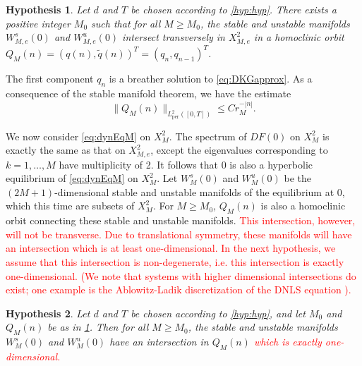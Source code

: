 \documentclass[12pt,reqno]{amsart}
\def\per{\textrm{per}}
\newtheorem{hypothesis}{Hypothesis}
\theoremstyle{definition}
\newcommand{\revised}[1]{ \textcolor{red}{#1} }
\begin{document}
\begin{hypothesis}\label{hyp:breather}
Let $d$ and $T$ be chosen according to \cref{hyp:hyp}. There exists a positive integer $M_0$ such that for all $M \geq M_0$, the stable and unstable manifolds $W_{M,e}^s(0)$ and $W_{M,e}^u(0)$ intersect transversely in $X_{M,e}^2$ in a homoclinic orbit $Q_M(n) = (q(n), \tilde{q}(n))^T = (q_n, q_{n-1})^T$. 
\end{hypothesis}
The first component $q_n$ is a breather solution to \cref{eq:DKGapprox}. As a consequence of the stable manifold theorem, we have the estimate 
\begin{equation}\label{eq:U1decayest}
\|Q_M(n)\|_{L^2_\per([0,T])} \leq C r_M^{-|n|}.
\end{equation}

We now consider \cref{eq:dynEqM} on $X_M^2$. The spectrum of $DF(0)$ on $X_M^2$ is exactly the same as that on $X_{M,e}^2$, except the eigenvalues corresponding to $k = 1, \dots, M$ have multiplicity of 2. It follows that 0 is also a hyperbolic equilibrium of \cref{eq:dynEqM} on $X_M^2$. Let $W_M^s(0)$ and $W_M^u(0)$ be the $(2M+1)$-dimensional stable and unstable manifolds of the equilibrium at 0, which this time are subsets of $X_M^2$. For $M \geq M_0$, $Q_M(n)$ is also a homoclinic orbit connecting these stable and unstable manifolds.  
\revised{
This intersection, however, will not be transverse. Due to translational symmetry, these manifolds will have an intersection which is at least one-dimensional.
In the next hypothesis, we assume that this intersection is non-degenerate, i.e. this intersection is exactly one-dimensional. (We note that systems with higher dimensional intersections do exist; one example is the Ablowitz-Ladik discretization of the DNLS equation \cites{Ablowitz1975,Ablowitz1976,Kapitula2001}).
}

\begin{hypothesis}\label{hyp:breathernondegen}
Let $d$ and $T$ be chosen according to \cref{hyp:hyp}, and let $M_0$ and $Q_M(n)$ be as in \cref{hyp:breather}. Then for all $M \geq M_0$, the stable and unstable manifolds $W_M^s(0)$ and $W_M^u(0)$ have an intersection in $Q_M(n)$ 
\revised{
which is exactly one-dimensional.
}
\end{hypothesis}
\end{document}

